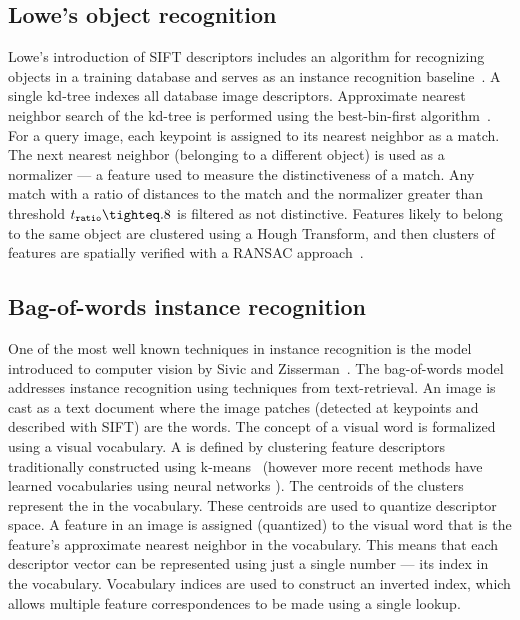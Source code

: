         \figSVInlier{}


    \subsection{Lowe's object recognition}

        Lowe's introduction of SIFT descriptors includes an algorithm for recognizing objects in a training database and
        serves as an instance recognition baseline~\cite{lowe_distinctive_2004}. A single kd-tree indexes all database
        image descriptors. Approximate nearest neighbor search of the kd-tree is performed using the best-bin-first
        algorithm~\cite{beis_shape_1997}. For a query image, each keypoint is assigned to its nearest neighbor as a
        match. The next nearest neighbor (belonging to a different object) is used as a normalizer --- a feature used to
        measure the distinctiveness of a match. Any match with a ratio of distances to the match and the normalizer
        greater than threshold $t_{\tt{ratio}}\tighteq.8$ is filtered as not distinctive. Features likely to belong to
        the same object are clustered using a Hough Transform, and then clusters of features are spatially verified with
        a RANSAC approach~\cite{fischler_random_1981}.


    \subsection{Bag-of-words instance recognition}\label{subsec:bow}

        One of the most well known techniques in instance recognition is the  model introduced
        to computer vision by Sivic and Zisserman~\cite{sivic_video_2003, sivic_efficient_2009}. The bag-of-words model
        addresses instance recognition using techniques from text-retrieval. An image is cast as a text document where
        the image patches (detected at keypoints and described with SIFT) are the words. The concept of a visual word is
        formalized using a visual vocabulary. A  is defined by clustering feature
        descriptors traditionally constructed using k-means~\cite{lloyd_least_1982} (however more recent methods have
        learned vocabularies using neural networks \cite{arandjelovic_netvlad_2016}). The centroids of the clusters
        represent the  in the vocabulary. These centroids are used to quantize descriptor space.
        A feature in an image is assigned (quantized) to the visual word that is the feature's approximate nearest
        neighbor in the vocabulary. This means that each descriptor vector can be represented using just a single number
        --- \ie{} its index in the vocabulary. Vocabulary indices are used to construct an inverted index, which allows
        multiple feature correspondences to be made using a single lookup.

